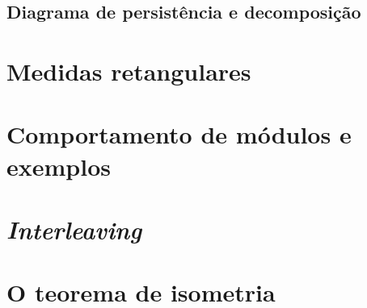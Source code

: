 \subsection{Diagrama de persistência e decomposição}

\section{Medidas retangulares}

\section{Comportamento de módulos e exemplos}

\section{\textit{Interleaving}} 

\section{O teorema de isometria}
